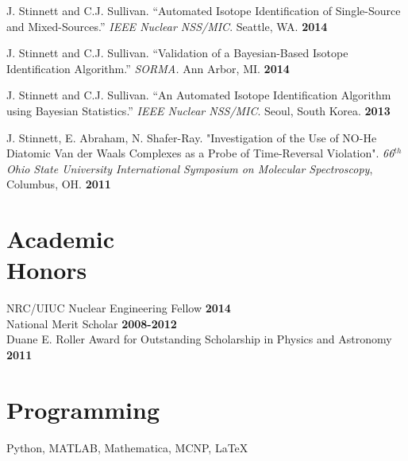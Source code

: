 \documentclass[margin]{res}
\begin{document}
\begin{resume}
J. Stinnett and C.J. Sullivan.  ``Automated Isotope Identification of Single-Source and Mixed-Sources.''  \textit{IEEE Nuclear NSS/MIC}. Seattle, WA.  \hfill \textbf{2014}

J. Stinnett and C.J. Sullivan.  ``Validation of a Bayesian-Based Isotope Identification Algorithm.'' \textit{SORMA.}  Ann Arbor, MI. \hfill \textbf{2014}

\vspace{-.05in}

J. Stinnett and C.J. Sullivan.  ``An Automated Isotope Identification Algorithm using Bayesian Statistics.''  \textit{IEEE Nuclear NSS/MIC}. Seoul, South Korea.  \hfill \textbf{2013}

\vspace{-.05in}

J. Stinnett, E. Abraham, N. Shafer-Ray.  "Investigation of the Use of NO-He Diatomic Van der Waals Complexes as a Probe of Time-Reversal Violation". \textit{ 66$^{th}$ Ohio State University International Symposium on Molecular Spectroscopy}, Columbus, OH. \hfill \textbf{2011}

\section{Academic \\ Honors} 
NRC/UIUC Nuclear Engineering Fellow \hfill \textbf{2014} \\
National Merit Scholar \hfill \textbf{2008-2012} \\
Duane E. Roller Award for Outstanding Scholarship in Physics and Astronomy \hfill \textbf{2011}

\section{Programming}
Python, MATLAB, Mathematica, MCNP, LaTeX
 
\end{resume} 
\end{document}
